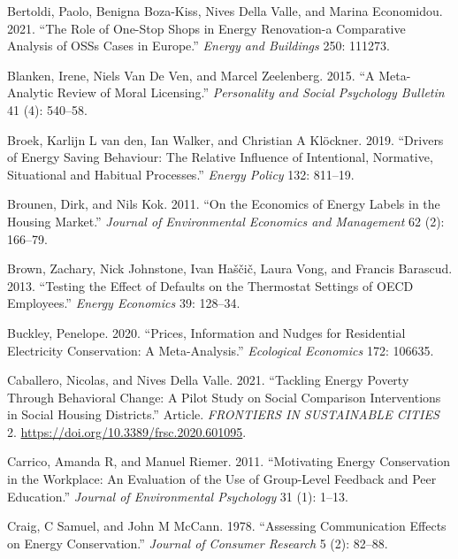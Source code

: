 \documentclass[
  11pt,
]{article}
\newlength{\cslhangindent}
\newlength{\cslentryspacingunit} %
\newenvironment{CSLReferences}[2] %
 {%
  \setlength{\parindent}{0pt}
  \ifodd #1
  \let\oldpar\par
  \def\par{\hangindent=\cslhangindent\oldpar}
  \fi
  \setlength{\parskip}{#2\cslentryspacingunit}
 }%
 {}
\begin{document}
\begin{CSLReferences}{1}{0}
\leavevmode{}%
Bertoldi, Paolo, Benigna Boza-Kiss, Nives Della Valle, and Marina
Economidou. 2021. {``The Role of One-Stop Shops in Energy Renovation-a
Comparative Analysis of OSSs Cases in Europe.''} \emph{Energy and
Buildings} 250: 111273.

\leavevmode{}%
Blanken, Irene, Niels Van De Ven, and Marcel Zeelenberg. 2015. {``A
Meta-Analytic Review of Moral Licensing.''} \emph{Personality and Social
Psychology Bulletin} 41 (4): 540--58.

\leavevmode{}%
Broek, Karlijn L van den, Ian Walker, and Christian A Klöckner. 2019.
{``Drivers of Energy Saving Behaviour: The Relative Influence of
Intentional, Normative, Situational and Habitual Processes.''}
\emph{Energy Policy} 132: 811--19.

\leavevmode{}%
Brounen, Dirk, and Nils Kok. 2011. {``On the Economics of Energy Labels
in the Housing Market.''} \emph{Journal of Environmental Economics and
Management} 62 (2): 166--79.

\leavevmode{}%
Brown, Zachary, Nick Johnstone, Ivan Haščič, Laura Vong, and Francis
Barascud. 2013. {``Testing the Effect of Defaults on the Thermostat
Settings of OECD Employees.''} \emph{Energy Economics} 39: 128--34.

\leavevmode{}%
Buckley, Penelope. 2020. {``Prices, Information and Nudges for
Residential Electricity Conservation: A Meta-Analysis.''}
\emph{Ecological Economics} 172: 106635.

\leavevmode{}%
Caballero, Nicolas, and Nives Della Valle. 2021. {``Tackling Energy
Poverty Through Behavioral Change: A Pilot Study on Social Comparison
Interventions in Social Housing Districts.''} Article. \emph{FRONTIERS
IN SUSTAINABLE CITIES} 2.
\url{https://doi.org/10.3389/frsc.2020.601095}.

\leavevmode{}%
Carrico, Amanda R, and Manuel Riemer. 2011. {``Motivating Energy
Conservation in the Workplace: An Evaluation of the Use of Group-Level
Feedback and Peer Education.''} \emph{Journal of Environmental
Psychology} 31 (1): 1--13.

\leavevmode{}%
Craig, C Samuel, and John M McCann. 1978. {``Assessing Communication
Effects on Energy Conservation.''} \emph{Journal of Consumer Research} 5
(2): 82--88.


\end{CSLReferences}
\end{document}
